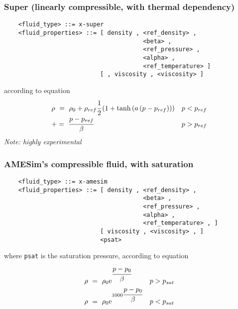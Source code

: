 \subsubsection{Super (linearly compressible, with thermal dependency)}
\begin{verbatim}
    <fluid_type> ::= x-super
    <fluid_properties> ::= [ density , <ref_density> , 
                                       <beta> , 
                                       <ref_pressure> ,
                                       <alpha> ,
                                       <ref_temperature> ]
                           [ , viscosity , <viscosity> ]
\end{verbatim}
according to equation
\begin{displaymath}
	\matr{ll}{
		\rho \ = \ \rho_0 + \rho_{ref}\cfrac{1}{2}\plbr{
			1 + \llk{tanh}\plbr{a\plbr{p-p_{ref}}}
		} & p < p_{ref} \\
		+= \ \cfrac{p-p_{ref}}{\beta} & p > p_{ref}
	}
\end{displaymath}
\emph{Note: highly experimental}

\subsubsection{AMESim's compressible fluid, with saturation}
\begin{verbatim}
    <fluid_type> ::= x-amesim
    <fluid_properties> ::= [ density , <ref_density> , 
                                       <beta> , 
                                       <ref_pressure> ,
                                       <alpha> ,
                                       <ref_temperature> , ]
                           [ viscosity , <viscosity> , ]
                           <psat>
\end{verbatim}
where \texttt{psat} is the saturation pressure, according to equation
\begin{displaymath}
	\matr{ll}{
		\rho \ = \ \rho_0 \e{\cfrac{p-p_0}{\beta}} &
		p > p_{sat} \\
		\rho \ = \ \rho_0 \e{1000\cfrac{p-p_0}{\beta}} &
		p < p_{sat}
	}
\end{displaymath}



